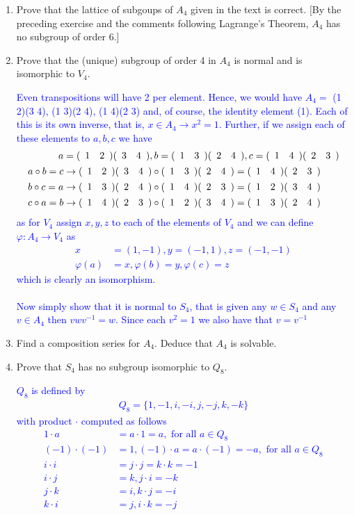 \documentclass[10pt,a4paper]{report}
\newcommand{\BLUE}[1]{\textcolor{blue}{#1}}
\begin{document}
\begin{enumerate}
\item Prove that the lattice of subgoups of $A_4$ given in the text is correct. [By the preceding exercise and the comments following Lagrange's Theorem, $A_4$ has no subgroup of order 6.]

\item Prove that the (unique) subgroup of order 4 in $A_4$ is normal and is isomorphic to $V_4$.

\BLUE{Even transpositions will have 2 per element.  Hence, we would have $A_4 =$ (1 2)(3 4), (1 3)(2 4), (1 4)(2 3) and, of course, the identity element (1).  Each of this is its own inverse, that is, $x \in A_4 \to x^2=1$.  Further, if we assign each of these elements to $a, b, c$ we have
\begin{align*}
	a &= (\begin{array}{cccccccccc} 1&2 \end{array})(\begin{array}{cccccccccc} 3&4 \end{array}), b=(\begin{array}{cccccccccc} 1&3 \end{array})(\begin{array}{cccccccccc} 2&4 \end{array}), c=(\begin{array}{cccccccccc} 1&4 \end{array})(\begin{array}{cccccccccc} 2&3 \end{array}) \\
	a \circ b = c &\to (\begin{array}{cccccccccc} 1&2 \end{array})(\begin{array}{cccccccccc} 3&4 \end{array}) \circ (\begin{array}{cccccccccc} 1&3 \end{array})(\begin{array}{cccccccccc} 2&4 \end{array}) = (\begin{array}{cccccccccc} 1&4 \end{array})(\begin{array}{cccccccccc} 2&3 \end{array}) \\
	b \circ c = a &\to   (\begin{array}{cccccccccc} 1&3 \end{array})(\begin{array}{cccccccccc} 2&4 \end{array})\circ (\begin{array}{cccccccccc} 1&4 \end{array})(\begin{array}{cccccccccc} 2&3 \end{array})  = (\begin{array}{cccccccccc} 1&2 \end{array})(\begin{array}{cccccccccc} 3&4 \end{array})\\
	c \circ a = b &\to (\begin{array}{cccccccccc} 1&4 \end{array})(\begin{array}{cccccccccc} 2&3 \end{array}) \circ (\begin{array}{cccccccccc} 1&2 \end{array})(\begin{array}{cccccccccc} 3&4 \end{array}) = (\begin{array}{cccccccccc} 1&3 \end{array})(\begin{array}{cccccccccc} 2&4 \end{array}) 
\end{align*}as for $V_4$ assign $x,y,z$ to each of the elements of $V_4$ and we can define $\varphi: A_4 \to V_4$ as
\begin{align*}
	x &= (1, -1), y=(-1,1), z=(-1,-1)\\
	\varphi(a) &= x, \varphi(b)=y, \varphi(c)=z
\end{align*} which is clearly an isomorphism.\\ \\  Now simply show that it is normal to $S_4$, that is given any $w \in S_4$ and any $v \in A_4$ then $vwv^{-1} = w$.  Since each $v^2 = 1$ we also have that $v=v^{-1}$
}

\item Find a composition series for $A_4$.  Deduce that $A_4$ is solvable.

\item Prove that $S_4$ has no subgroup isomorphic to $Q_8$.

\BLUE{$Q_8$ is defined by \begin{align*}
	Q_8=\{1,-1,i,-i,j,-j, k,-k\}
\end{align*}with product $\cdot$ computed as follows
\begin{align*}
	1\cdot a&=a\cdot 1 =a, \text{ for all }a \in Q_8\\
	(-1)\cdot(-1) &= 1, (-1)\cdot a=a \cdot (-1) = -a, \text{ for all } a \in Q_8 \\
	i \cdot i &= j \cdot j = k \cdot k = -1 \\
	i \cdot j &= k, j \cdot i = -k \\
	j \cdot k &= i, k \cdot j = -i \\
	k \cdot i &= j, i \cdot k = -j
\end{align*}
}


\end{enumerate}
\end{document}
